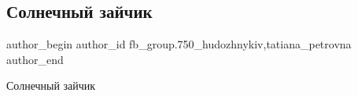  
 
 
 
 

\subsection{Солнечный зайчик}
\label{sec:01_04_2018.fb.fb_group.750_hudozhnykiv.1.solnechnyj_krolik}
 
\ifcmt
 author_begin
   author_id fb_group.750_hudozhnykiv,tatiana_petrovna
 author_end
\fi

Солнечный зайчик

